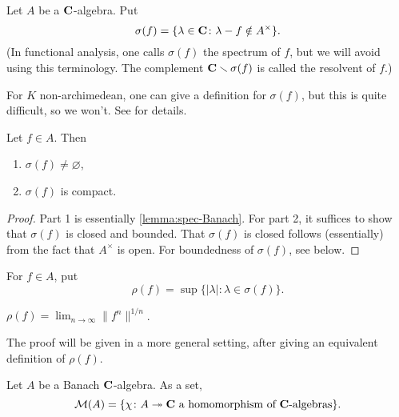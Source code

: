 \begin{definition}
Let $A$ be a $\mathbf{C}$-algebra. Put 
\[
  \sigma(f) = \{\lambda\in \mathbf{C}\colon \lambda-f\notin A^\times\} .
\]
(In functional analysis, one calls $\sigma(f)$ the spectrum of $f$, but we will 
avoid using this terminology. The complement $\mathbf{C}\smallsetminus \sigma(f)$ is 
called the resolvent of $f$.)
\end{definition}

For $K$ non-archimedean, one can give a definition for $\sigma(f)$, but this is 
quite difficult, so we won't. See \cite[Ch.~7]{berkovich-1990} for details. 

\begin{theorem}
Let $f\in A$. Then 
\begin{enumerate}
\item
$\sigma(f)\ne\varnothing$, 

\item
$\sigma(f)$ is compact. 
\end{enumerate}
\end{theorem}
\begin{proof}
Part 1 is essentially \autoref{lemma:spec-Banach}. For part 2, it suffices to 
show that $\sigma(f)$ is closed and bounded. That $\sigma(f)$ is closed follows 
(essentially) from the fact that $A^\times$ is open. For boundedness of 
$\sigma(f)$, see below. 
\end{proof}

\begin{definition}
For $f\in A$, put 
\[
  \rho(f) = \sup\{|\lambda|\colon \lambda\in \sigma(f)\} .
\]
\end{definition}

\begin{theorem}
$\rho(f) = \lim_{n\to \infty} \|f^n\|^{1/n}$. 
\end{theorem}
The proof will be given in a more general setting, after giving an equivalent 
definition of $\rho(f)$. 

\begin{definition}
Let $A$ be a Banach $\mathbf{C}$-algebra. As a set, 
\[
  \mathcal{M}(A) = \{\chi\colon A\twoheadrightarrow \mathbf{C}\text{ a homomorphism of $\mathbf{C}$-algebras}\} .
\]
\end{definition}

